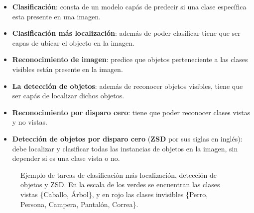 \begin{itemize}
	\item \textbf{Clasificación}: consta de un modelo capás de predecir si una clase específica esta presente en una imagen. 
	\item \textbf{Clasificación más localización}: además de poder clasificar tiene que ser capas de ubicar el objecto en la imagen.
	\item \textbf{Reconocimiento de imagen}: predice que objetos perteneciente a las clases visibles están presente en la imagen. 
	\item \textbf{La detección de objetos}: además de reconocer objetos visibles, tiene que ser capás de localizar dichos objetos. 
	\item \textbf{Reconocimiento por disparo cero}: tiene que poder reconocer clases vistas y no vistas.
	\item \textbf{Detección de objetos por disparo cero} (\textbf{ZSD} por sus siglas en inglés): debe localizar y clasificar todas las instancias de objetos en la imagen, sin depender si es una clase vista o no.
\end{itemize}

\begin{figure}[]
  \centering
  \caption{Ejemplo de tareas de clasificación más localización, detección de objetos y ZSD. En la escala de los verdes se encuentran las clases vistas \{Caballo, Árbol\}, y en rojo las clases invisibles \{Perro, Persona, Campera, Pantalón, Correa\}.}
  \label{fig:DetectoresYSZD}
\end{figure}


